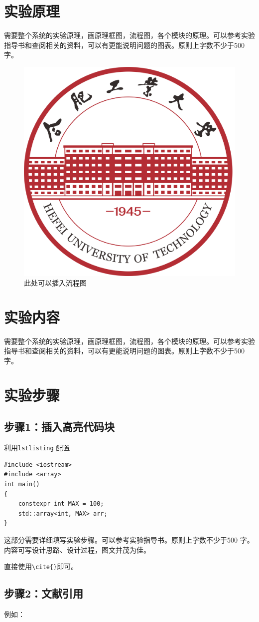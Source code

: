 \documentclass[12pt,hyperref,a4paper,twoside,UTF8]{ctexart}
\begin{document}
\section{实验原理}

需要整个系统的实验原理，画原理框图，流程图，各个模块的原理。可以参考实验指导书和查阅相关的资料，可以有更能说明问题的图表。原则上字数不少于500字。

\begin{figure}[!htbp]
    \centering
    \includegraphics[width =.3\textwidth]{figures/hfutlogo.png}
    \caption{此处可以插入流程图}
    \label{Library}
\end{figure}


\section{实验内容}

需要整个系统的实验原理，画原理框图，流程图，各个模块的原理。可以参考实验指导书和查阅相关的资料，可以有更能说明问题的图表。原则上字数不少于500字。
\section{实验步骤}
\subsection{步骤1：插入高亮代码块}
利用\verb|lstlisting| 配置
\begin{lstlisting}[style=CPP, title="c++代码"]
#include <iostream>
#include <array>
int main()
{
    constexpr int MAX = 100;
    std::array<int, MAX> arr;
}  
\end{lstlisting}


这部分需要详细填写实验步骤。可以参考实验指导书。原则上字数不少于500
字。内容可写设计思路、设计过程，图文并茂为佳。





直接使用\verb|\cite{}|即可\cite{DBLP:conf/nips/VaswaniSPUJGKP17}。
\subsection{步骤2：文献引用}
例如：
\end{document}
